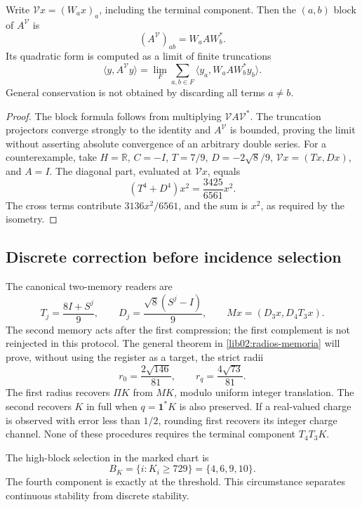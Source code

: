 \begin{proposition}
\label{lib01:correlaciones}
Write \(\mathcal Vx=(W_ax)_a\), including the terminal component. Then the \((a,b)\) block of \(A^{\mathcal V}\) is
\[
 (A^{\mathcal V})_{ab}=W_aAW_b^*.
\]
Its quadratic form is computed as a limit of finite truncations
\[
 \langle y,A^{\mathcal V}y\rangle
 =\lim_F\sum_{a,b\in F}\langle y_a,W_aAW_b^*y_b\rangle.
\]
General conservation is not obtained by discarding all terms \(a\ne b\).
\end{proposition}
\begin{proof}
The block formula follows from multiplying \(\mathcal VA\mathcal V^*\). The truncation projectors converge strongly to the identity and \(A^{\mathcal V}\) is bounded, proving the limit without asserting absolute convergence of an arbitrary double series. For a counterexample, take \(H=\mathbb R\), \(C=-I\), \(T=7/9\), \(D=-2\sqrt8/9\), \(\mathcal Vx=(Tx,Dx)\), and \(A=I\). The diagonal part, evaluated at \(\mathcal Vx\), equals
\[
 (T^4+D^4)x^2=\frac{3425}{6561}x^2.
\]
The cross terms contribute \(3136x^2/6561\), and the sum is \(x^2\), as required by the isometry.
\end{proof}

\subsection{Discrete correction before incidence selection}
\label{lib01:correccion-incidencia}

The canonical two-memory readers are
\[
 T_j=\frac{8I+S^j}{9},\qquad
 D_j=\frac{\sqrt8(S^j-I)}9,\qquad
 Mx=(D_3x,D_4T_3x).
\]
The second memory acts after the first compression; the first complement is not reinjected in this protocol. The general theorem in \cref{lib02:radios-memoria} will prove, without using the register as a target, the strict radii
\[
 r_0=\frac{2\sqrt{146}}{81},\qquad
 r_q=\frac{4\sqrt{73}}{81}.
\]
The first radius recovers \(\Pi K\) from \(MK\), modulo uniform integer translation. The second recovers \(K\) in full when \(q=\mathbf1^*K\) is also preserved. If a real-valued charge is observed with error less than \(1/2\), rounding first recovers its integer charge channel. None of these procedures requires the terminal component \(T_4T_3K\).

The high-block selection in the marked chart is
\begin{equation}
 B_K=\{i:K_i\geq729\}=\{4,6,9,10\}.
 \label{lib01:umbral}
\end{equation}
The fourth component is exactly at the threshold. This circumstance separates continuous stability from discrete stability.

